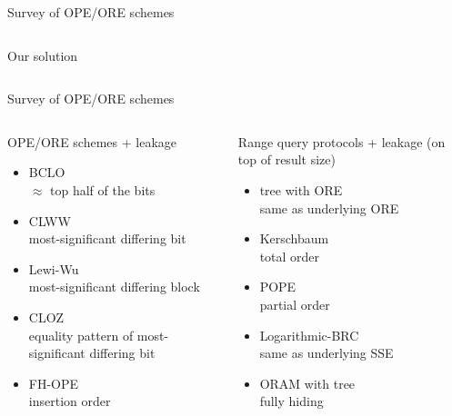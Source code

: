\begin{frame}{Survey of OPE/ORE schemes~\cite{ore-benchmark-17}}
\begin{columns}[T,onlytextwidth]
{\begin{block}{Our solution}
						\end{block}
					}

			\end{columns}

		\end{frame}

		\begin{frame}{Survey of OPE/ORE schemes~\cite{ore-benchmark-17}}

			\begin{columns}[T,onlytextwidth]

					\begin{block}{OPE/ORE schemes + leakage}

						\begin{itemize}
							\item \normalsize BCLO~\cite{crypt-db-ope} \\ \small{$\approx$ top half of the bits}
							\item \normalsize CLWW~\cite{practical-ore} \\ \small{most-significant differing bit}
							\item \normalsize Lewi-Wu~\cite{lewi-ore} \\ \small{most-significant differing block}
							\item \normalsize CLOZ~\cite{adam-ore-v2} \\ \small{equality pattern of most-significant differing bit}
							\item \normalsize FH-OPE~\cite{fh-ope} \\ \small{insertion order}
						\end{itemize}

					\end{block}


					\begin{block}{Range query protocols + leakage (on top of result size)}

						\begin{itemize}
							\item \normalsize {\BPlus} tree with ORE \\ \small{same as underlying ORE}
							\item \normalsize Kerschbaum~\cite{florian-protocol} \\ \small{total order}
							\item \normalsize POPE~\cite{pope} \\ \small{partial order}
							\item \normalsize Logarithmic-BRC~\cite{practical-range-search} \\ \small{same as underlying SSE}
							\item \normalsize ORAM with {\BPlus} tree \\ \small{fully hiding}
						\end{itemize}


\end{block}
\end{columns}
\end{frame}
